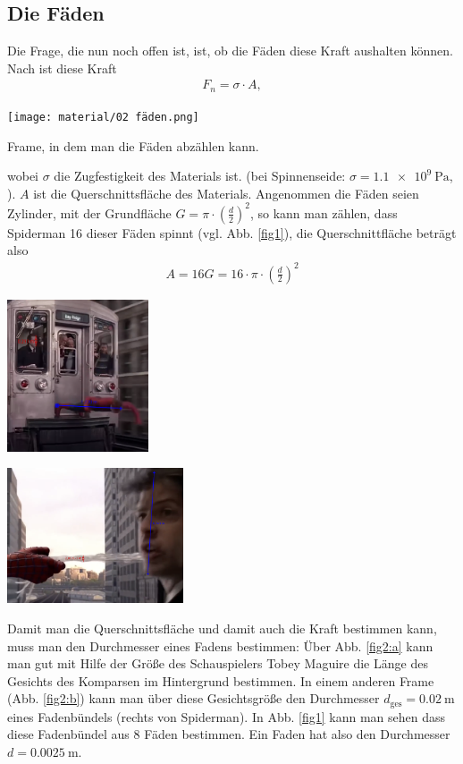 \documentclass[a4paper, 11pt, nofonts, 
twoside, sfsidenotes, nobib, justified]{tufte-handout}
\begin{document}
\subsection{Die Fäden}
Die Frage, die nun noch offen ist, ist, ob die Fäden diese Kraft aushalten können. Nach \cite{WSem07} ist diese Kraft 
\begin{align}
	F_n=\sigma \cdot A,
\end{align}
\begin{marginfigure}
	\centering
	\texttt{[image: material/02 fäden.png]}
	\caption{Frame, in dem man die Fäden abzählen kann.}
	\label{fig1}
\end{marginfigure}
wobei $\sigma$ die Zugfestigkeit des Materials ist. (bei Spinnenseide: $\sigma = \SI{1.1e9}{\pascal}$, \cite{WSem08}). $A$ ist die Querschnittsfläche des Materials. Angenommen die Fäden seien Zylinder, mit der Grundfläche $G=\pi\cdot (\frac d2)^2$, so kann man zählen, dass Spiderman 16 dieser Fäden spinnt (vgl. Abb. \ref{fig1}), die Querschnittfläche beträgt also 
\begin{align}
	A=16G=16\cdot \pi\cdot \left(\frac d2\right)^2
\end{align}
\newpage
\begin{marginfigure}
	\centering
	\includegraphics[height = 4.5cm]{material/05 gersicht.png}
	\caption{}
	\label{fig2:a}
\end{marginfigure}
\begin{marginfigure}
	\centering
	\vspace{.5cm}
	\includegraphics[height =4cm]{material/06 faden neu.png}
	\caption{}
	\label{fig2:b}
\end{marginfigure}
Damit man die Querschnittsfläche und damit auch die Kraft bestimmen kann, muss man den Durchmesser eines Fadens bestimmen: Über Abb. \ref{fig2:a} kann man gut mit Hilfe der Größe des Schauspielers Tobey Maguire \cite{WSem11} die Länge des Gesichts des Komparsen im Hintergrund bestimmen. In einem anderen Frame (Abb. \ref{fig2:b}) kann man über diese Gesichtsgröße den Durchmesser $d_\text{ges}=\SI{0.02}{\meter}$ eines Fadenbündels (rechts von Spiderman). In Abb. \ref{fig1} kann man sehen dass diese Fadenbündel aus 8 Fäden bestimmen. Ein Faden hat also den Durchmesser $d=\SI{0.0025}{\meter}$. \\
\end{document}
